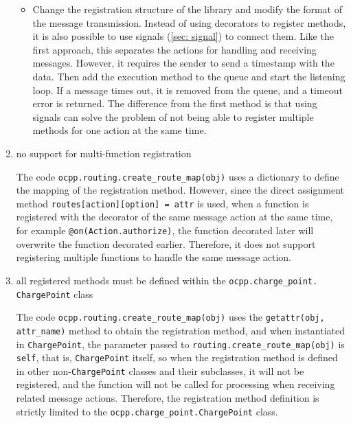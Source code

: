 \documentclass[
	english,
	ruledheaders=section,%
	class=report,%
	thesis={type=Report},%
	accentcolor=9c,%
	custommargins=true,%
	marginpar=false,%
	parskip=half-,%
	fontsize=11pt,%
	logofile={img/tuda_logo.pdf}, %
]{tudapub}
\begin{document}
\begin{enumerate}
\begin{itemize}
        \item %

        Change the registration structure of the library and modify the format of the message transmission. Instead of using decorators to register methods, it is also possible to use signals (\autoref{sec: signal}) to connect them. Like the first approach, this separates the actions for handling and receiving messages. However, it requires the sender to send a timestamp with the data. Then add the execution method to the queue and start the listening loop. If a message times out, it is removed from the queue, and a timeout error is returned. The difference from the first method is that using signals can solve the problem of not being able to register multiple methods for one action at the same time.
        
    \end{itemize}
    
    \item no support for multi-function registration
    
    The code \texttt{ocpp.routing.create\_route\_map(obj)} uses a dictionary to define the mapping of the registration method. However, since the direct assignment method \texttt{routes[action][option] = attr} is used, when a function is registered with the decorator of the same message action at the same time, for example \texttt{@on(Action.authorize)}, the function decorated later will overwrite the function decorated earlier. Therefore, it does not support registering multiple functions to handle the same message action.
    
    \item all registered methods must be defined within the \texttt{ocpp.charge\_point.\\ChargePoint} class

    The code \texttt{ocpp.routing.create\_route\_map(obj)} uses the \texttt{getattr(obj, attr\_name)} method to obtain the registration method, and when instantiated in \texttt{ChargePoint}, the parameter passed to \texttt{routing.create\_route\_map(obj)} is \texttt{self}, that is, \texttt{ChargePoint} itself, so when the registration method is defined in other non-\texttt{ChargePoint} classes and their subclasses, it will not be registered, and the function will not be called for processing when receiving related message actions. Therefore, the registration method definition is strictly limited to the \texttt{ocpp.charge\_point.ChargePoint} class.
\end{enumerate}
\end{document}
